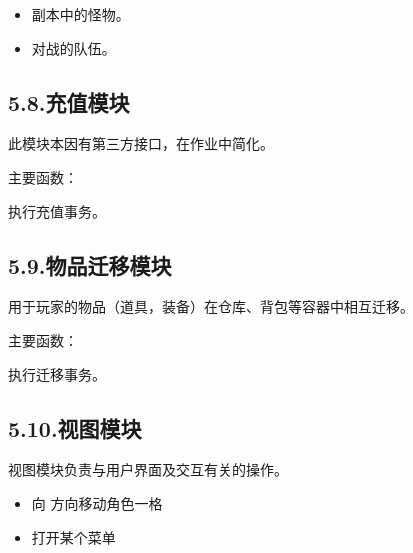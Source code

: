 \documentclass{article}
\begin{document}
\begin{itemize}[noitemsep,topsep=\mdcompacttopsep]%

\item{}副本中的怪物。%

\item{}对战的队伍。%
\end{itemize}%

\subsection{5.8.\hspace*{0.5em}充值模块}\label{57}%

\noindent{}此模块本因有第三方接口，在作业中简化。%

主要函数：%

执行充值事务。%

\subsection{5.9.\hspace*{0.5em}物品迁移模块}\label{58}%

\noindent{}用于玩家的物品（道具，装备）在仓库、背包等容器中相互迁移。%

主要函数：%

执行迁移事务。%

\subsection{5.10.\hspace*{0.5em}视图模块}\label{59}%

\noindent{}视图模块负责与用户界面及交互有关的操作。%

\begin{itemize}[noitemsep,topsep=\mdcompacttopsep]%

\item{} 向  方向移动角色一格%

\item{} 打开某个菜单%
\end{itemize}%
\end{document}
